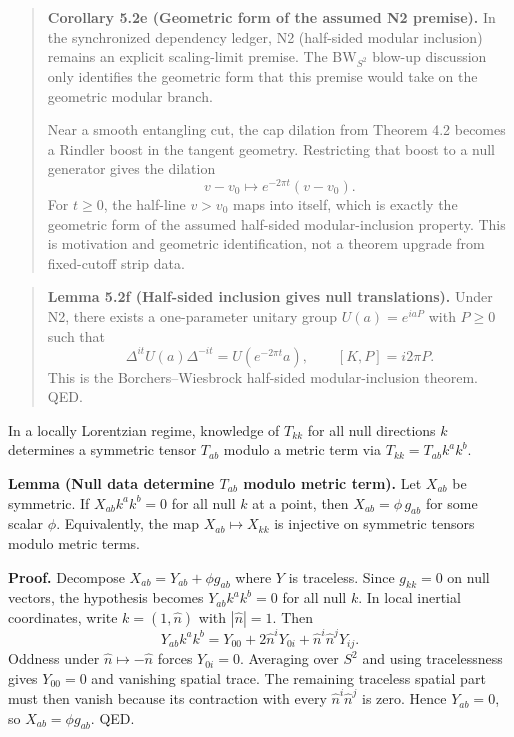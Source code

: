 \begin{quote}
\textbf{Corollary 5.2e (Geometric form of the assumed N2 premise).} In the synchronized dependency ledger, N2 (half-sided modular inclusion) remains an explicit scaling-limit premise. The BW\(_{S^2}\) blow-up discussion only identifies the geometric form that this premise would take on the geometric modular branch.

Near a smooth entangling cut, the cap dilation from Theorem 4.2 becomes a Rindler boost in the tangent geometry. Restricting that boost to a null generator gives the dilation
\[
v-v_0 \mapsto e^{-2\pi t}(v-v_0).
\]
For \(t\ge 0\), the half-line \(v>v_0\) maps into itself, which is exactly the geometric form of the assumed half-sided modular-inclusion property. This is motivation and geometric identification, not a theorem upgrade from fixed-cutoff strip data.
\end{quote}

\begin{quote}
\textbf{Lemma 5.2f (Half-sided inclusion gives null translations).} Under N2, there exists a one-parameter unitary group \(U(a)=e^{iaP}\) with \(P\ge 0\) such that
\[
\Delta^{it}U(a)\Delta^{-it}=U(e^{-2\pi t}a),
\qquad
[K,P]=i2\pi P.
\]
This is the Borchers--Wiesbrock half-sided modular-inclusion theorem. QED.
\end{quote}

In a locally Lorentzian regime, knowledge of \(T_{kk}\) for all null directions \(k\) determines a symmetric tensor \(T_{ab}\) modulo a metric term via \(T_{kk}=T_{ab}k^a k^b\).

\textbf{Lemma (Null data determine \(T_{ab}\) modulo metric term).} Let \(X_{ab}\) be symmetric. If \(X_{ab}k^a k^b=0\) for all null \(k\) at a point, then \(X_{ab}=\phi\,g_{ab}\) for some scalar \(\phi\). Equivalently, the map \(X_{ab}\mapsto X_{kk}\) is injective on symmetric tensors modulo metric terms.

\textbf{Proof.} Decompose \(X_{ab}=Y_{ab}+\phi g_{ab}\) where \(Y\) is traceless. Since \(g_{kk}=0\) on null vectors, the hypothesis becomes \(Y_{ab}k^a k^b=0\) for all null \(k\). In local inertial coordinates, write \(k=(1,\hat n)\) with \(|\hat n|=1\). Then
\[
Y_{ab}k^a k^b
=
Y_{00}+2\hat n^iY_{0i}+\hat n^i\hat n^jY_{ij}.
\]
Oddness under \(\hat n\mapsto-\hat n\) forces \(Y_{0i}=0\). Averaging over \(S^2\) and using tracelessness gives \(Y_{00}=0\) and vanishing spatial trace. The remaining traceless spatial part must then vanish because its contraction with every \(\hat n^i\hat n^j\) is zero. Hence \(Y_{ab}=0\), so \(X_{ab}=\phi g_{ab}\). QED.

